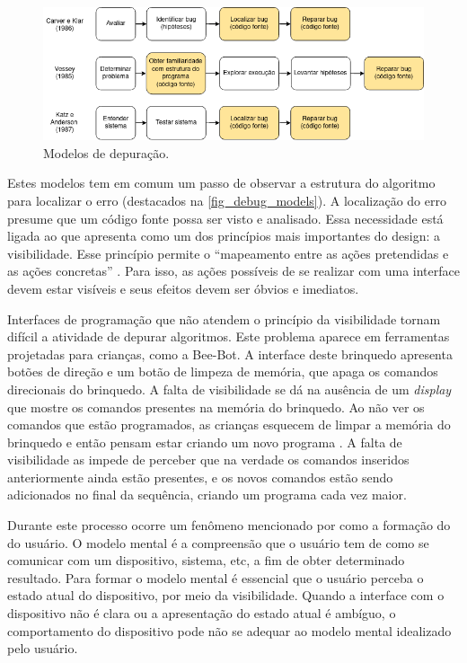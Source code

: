 \begin{figure}[!htpb]
  \centering
  \includegraphics[width=.9\linewidth,fbox]{figs/debug_models.png}
  \caption{Modelos de depuração.}
  \sourceauthor
  \label{fig_debug_models}
\end{figure}

Estes modelos tem em comum um passo de observar a estrutura do algoritmo para localizar o erro (destacados na \autoref{fig_debug_models}). A localização do erro presume que um código fonte possa ser visto e analisado. Essa necessidade está ligada ao que  apresenta como um dos princípios mais importantes do design: a visibilidade. Esse princípio permite o “mapeamento entre as ações pretendidas e as ações concretas” \cite{norman_design_1988}. Para isso, as ações possíveis de se realizar com uma interface devem estar visíveis e seus efeitos devem ser óbvios e imediatos.

Interfaces de programação que não atendem o princípio da visibilidade tornam difícil a atividade de depurar algoritmos. Este problema aparece em ferramentas projetadas para crianças, como a Bee-Bot. A interface deste brinquedo apresenta botões de direção e um botão de limpeza de memória, que apaga os comandos direcionais do brinquedo. A falta de visibilidade se dá na ausência de um \textit{display} que mostre os comandos presentes na memória do brinquedo. Ao não ver os comandos que estão programados, as crianças esquecem de limpar a memória do brinquedo e então pensam estar criando um novo programa \cite{raabe_brinquedos_2015}. A falta de visibilidade as impede de perceber que na verdade os comandos inseridos anteriormente ainda estão presentes, e os novos comandos estão sendo adicionados no final da sequência, criando um programa cada vez maior.

Durante este processo ocorre um fenômeno mencionado por  como a formação do  do usuário. O modelo mental é a compreensão que o usuário tem de como se comunicar com um dispositivo, sistema, etc, a fim de obter determinado resultado. Para formar o modelo mental é essencial que o usuário perceba o estado atual do dispositivo, por meio da visibilidade. Quando a interface com o dispositivo não é clara ou a apresentação do estado atual é ambíguo, o comportamento do dispositivo pode não se adequar ao modelo mental idealizado pelo usuário.

